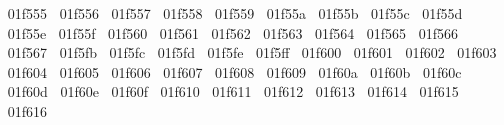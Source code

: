 {  ^^^^^^01f555%
  ^^^^^^01f556%
  ^^^^^^01f557%
  ^^^^^^01f558%
  ^^^^^^01f559%
  ^^^^^^01f55a%
  ^^^^^^01f55b%
  ^^^^^^01f55c%
  ^^^^^^01f55d%
  ^^^^^^01f55e%
  ^^^^^^01f55f%
  ^^^^^^01f560%
  ^^^^^^01f561%
  ^^^^^^01f562%
  ^^^^^^01f563%
  ^^^^^^01f564%
  ^^^^^^01f565%
  ^^^^^^01f566%
  ^^^^^^01f567%
  ^^^^^^01f5fb%
  ^^^^^^01f5fc%
  ^^^^^^01f5fd%
  ^^^^^^01f5fe%
  ^^^^^^01f5ff%
  ^^^^^^01f600%
  ^^^^^^01f601%
  ^^^^^^01f602%
  ^^^^^^01f603%
  ^^^^^^01f604%
  ^^^^^^01f605%
  ^^^^^^01f606%
  ^^^^^^01f607%
  ^^^^^^01f608%
  ^^^^^^01f609%
  ^^^^^^01f60a%
  ^^^^^^01f60b%
  ^^^^^^01f60c%
  ^^^^^^01f60d%
  ^^^^^^01f60e%
  ^^^^^^01f60f%
  ^^^^^^01f610%
  ^^^^^^01f611%
  ^^^^^^01f612%
  ^^^^^^01f613%
  ^^^^^^01f614%
  ^^^^^^01f615%
  ^^^^^^01f616%
}
